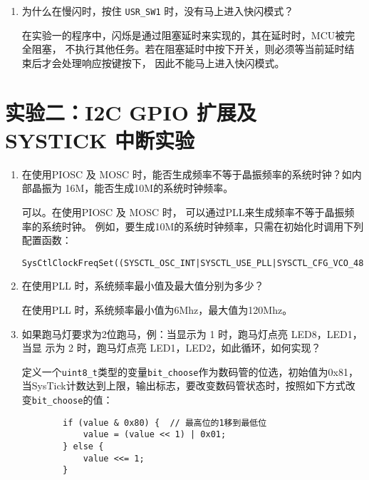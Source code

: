 \documentclass[12pt, a4paper, oneside]{ctexart}
\begin{document}
\begin{enumerate}[listparindent=2em]
        \item 为什么在慢闪时，按住 \verb|USR_SW1| 时，没有马上进入快闪模式？
        
        {\kaishu 在实验一的程序中，闪烁是通过阻塞延时来实现的，其在延时时，MCU被完全阻塞，
        不执行其他任务。若在阻塞延时中按下开关，则必须等当前延时结束后才会处理响应按键按下，
        因此不能马上进入快闪模式。}

       
        
       
       

    \end{enumerate}

    \section{实验二：I2C GPIO 扩展及 SYSTICK 中断实验}
    \begin{enumerate}[listparindent=2em]
        \item  在使用PIOSC 及 MOSC 时，能否生成频率不等于晶振频率的系统时钟？如内部晶振为
        16M，能否生成10M的系统时钟频率。

        {\kaishu 可以。在使用PIOSC 及 MOSC 时，
        可以通过PLL来生成频率不等于晶振频率的系统时钟。
        例如，要生成10M的系统时钟频率，只需在初始化时调用下列配置函数：
        \begin{lstlisting}
SysCtlClockFreqSet((SYSCTL_OSC_INT|SYSCTL_USE_PLL|SYSCTL_CFG_VCO_480),10000000);
        \end{lstlisting}
        }

        \item 在使用PLL 时，系统频率最小值及最大值分别为多少？
        
        {\kaishu 在使用PLL 时，系统频率最小值为6Mhz，最大值为120Mhz。}
        
        \item 如果跑马灯要求为2位跑马，例：当显示为 1 时，跑马灯点亮 LED8，LED1，当显
        示为 2 时，跑马灯点亮 LED1，LED2，如此循环，如何实现？

        {\kaishu 定义一个\verb|uint8_t|类型的变量\verb|bit_choose|作为数码管的位选，初始值为0x81，
        当SysTick计数达到上限，输出标志，要改变数码管状态时，按照如下方式改变\verb|bit_choose|的值：}

        \begin{lstlisting}
        if (value & 0x80) {  // 最高位的1移到最低位
            value = (value << 1) | 0x01;  
        } else {
            value <<= 1; 
        }
        \end{lstlisting}


\end{enumerate}
\end{document}
